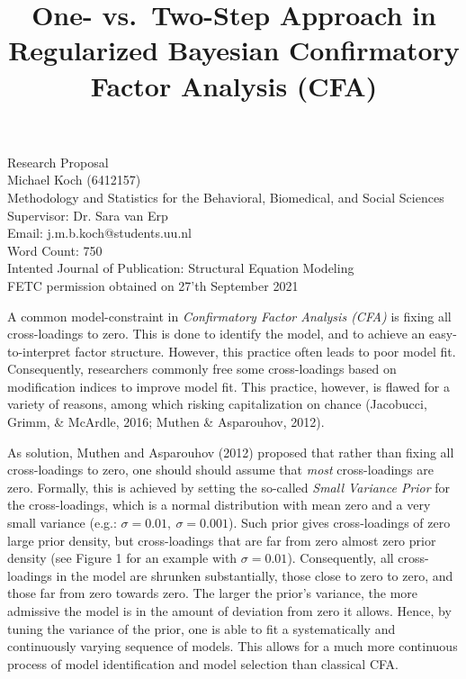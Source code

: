 \documentclass[
  english,
  man]{apa6}
\title{One- vs.~Two-Step Approach in Regularized Bayesian Confirmatory Factor Analysis (CFA)}
\author{\phantom{0}}
\date{}
\affiliation{\phantom{0}}
\begin{document}
\maketitle

\vfill
Research Proposal \\
Michael Koch (6412157)\\
Methodology and Statistics for the Behavioral, Biomedical, and Social Sciences \\
Supervisor: Dr. Sara van Erp \\ 
Email: j.m.b.koch@students.uu.nl \\
Word Count: 750 \\
Intented Journal of Publication: Structural Equation Modeling \\
FETC permission obtained on 27'th September 2021

\setcounter{page}{0}
\thispagestyle{empty}
\pagestyle{plain}

\clearpage

A common model-constraint in \emph{Confirmatory Factor Analysis (CFA)} is
fixing all cross-loadings to zero. This is done to identify the model,
and to achieve an easy-to-interpret factor structure. However, this
practice often leads to poor model fit. Consequently, researchers
commonly free some cross-loadings based on modification indices to
improve model fit. This practice, however, is flawed for a variety of
reasons, among which risking capitalization on chance
(Jacobucci, Grimm, \& McArdle, 2016; Muthen \& Asparouhov, 2012).

As solution, Muthen and Asparouhov (2012) proposed that rather than fixing all
cross-loadings to zero, one should should assume that \emph{most}
cross-loadings are zero. Formally, this is achieved by setting the
so-called \emph{Small Variance Prior} for the cross-loadings, which is a
normal distribution with mean zero and a very small variance (e.g.:
\(\sigma = 0.01, \  \sigma = 0.001\)). Such prior gives cross-loadings of
zero large prior density, but cross-loadings that are far from zero
almost zero prior density (see Figure 1 for an example with
\(\sigma = 0.01\)). Consequently, all cross-loadings in the model are
shrunken substantially, those close to zero to zero, and those far from
zero towards zero. The larger the prior's variance, the more admissive
the model is in the amount of deviation from zero it allows. Hence, by
tuning the variance of the prior, one is able to fit a systematically
and continuously varying sequence of models. This allows for a much more
continuous process of model identification and model selection than
classical CFA.
\end{document}
